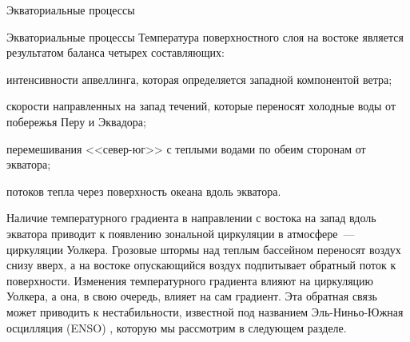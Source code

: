 \begin{chapter}{Экваториальные процессы}
\begin{section}{Экваториальные процессы}
Температура поверхностного слоя%
 на востоке является результатом баланса 
четырех составляющих:
%
\begin{enumparen}

\item
интенсивности апвеллинга, которая определяется 
западной компонентой ветра;
%

\item
скорости направленных на запад течений, которые переносят холодные воды
от побережья Перу и Эквадора;
%

\item
перемешивания <<север-юг>> с теплыми 
водами по обеим сторонам от экватора;
%

\item
потоков тепла через поверхность океана вдоль экватора. 
%
\end{enumparen}

Наличие температурного градиента в направлении с востока на запад
вдоль экватора приводит к появлению зональной циркуляции в
атмосфере~--- циркуляции Уолкера. Грозовые штормы
над теплым бассейном переносят воздух снизу вверх, а на востоке опускающийся
воздух подпитывает обратный поток к поверхности. Изменения
температурного градиента влияют на циркуляцию Уолкера, а она, в свою
очередь, влияет на сам градиент. Эта обратная связь может приводить к
нестабильности, известной под названием Эль-Ниньо-Южная осцилляция (ENSO)%
%
,
которую мы рассмотрим в следующем разделе.
%


\end{section}
\end{chapter}
